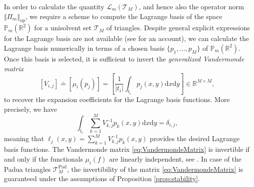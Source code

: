 \documentclass{svjour3}
\newcommand{\de}{\mathrm{d}}
\newcommand{\T}{\mathcal{T}}
\renewcommand{\P}{\mathbb{P}} %
\renewcommand{\de}{\mathrm{d}} %
\begin{document}
In order to calculate the quantity $\mathscr{L}_m \left(\mathcal{T}_M\right)$, and hence also the operator norm $\left\Vert \Pi_m \right\Vert_{\mathrm{op}}$, we require a scheme to compute the Lagrange basis of the space $ \P_m \left(\mathbb{R}^2\right)$ for a unisolvent set $\mathcal{T}_M$ of triangles.
Despite general explicit expressions for the Lagrange basis are not available (see \cite{bruni2024polynomial} for an account), we can calculate the Lagrange basis numerically in terms of a chosen basis $ \{ p_1, \ldots, p_M \} $ of $ \P_m\left(\mathbb{R}^2\right) $. Once this basis is selected, it is sufficient to invert the \emph{generalized Vandermonde matrix}%
\begin{equation} \label{eq:VandermondeMatrix}
	[V_{i,j}] \doteq [\mu_i(p_j)] = \left[ \frac{1}{|t_i|} \int_{t_i} p_j(x,y) \de x \de y \right] \in \mathbb{R}^{M \times M},
\end{equation}
to recover the expansion coefficients for the Lagrange basis functions. More precisely, we have
$$ \int_{t_i} \sum_{k=1}^M V_{k,j}^{-1} p_k (x,y) \de x \de y = \delta_{i,j} ,$$
meaning that $ \ell_j (x,y) = \sum_{k=1}^M V_{k,j}^{-1} p_k (x,y) $ provides the desired Lagrange basis functions. The Vandermonde matrix \eqref{eq:VandermondeMatrix} is invertible if and only if the functionals $\mu_i(f)$ are linearly independent, see \cite[Lemma 3.2.2]{AtkinsonHan}. In case of the Padua triangles $\T_M^{\mathrm{Pad}}$, the invertibility of the matrix \eqref{eq:VandermondeMatrix} is guaranteed under the assumptions of Proposition \ref{prop:stability}.  
\end{document}
